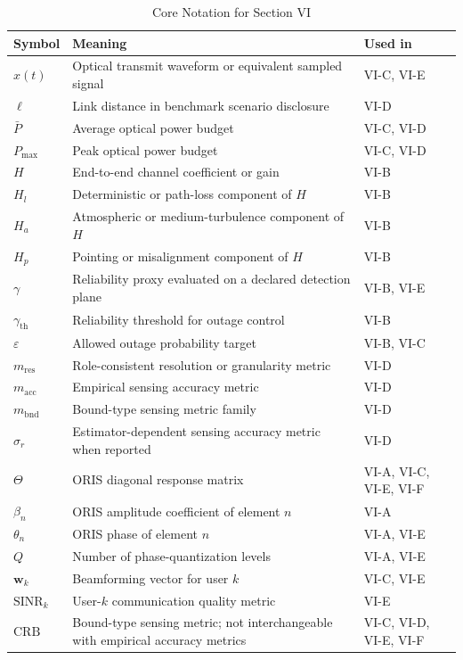 \begin{table}[!t]
\caption{Core Notation for Section VI}
\label{tab:enablers-notation}
\centering
\scriptsize
\setlength{\tabcolsep}{4pt}
\begin{tabularx}{\textwidth}{>{\raggedright\arraybackslash}p{} >{\raggedright\arraybackslash}p{} >{\raggedright\arraybackslash}X}
\toprule
\textbf{Symbol} & \textbf{Meaning} & \textbf{Used in} \\
\midrule
$x(t)$ & Optical transmit waveform or equivalent sampled signal & VI-C, VI-E \\
$\ell$ & Link distance in benchmark scenario disclosure & VI-D \\
$\bar P$ & Average optical power budget & VI-C, VI-D \\
$P_{\max}$ & Peak optical power budget & VI-C, VI-D \\
$H$ & End-to-end channel coefficient or gain & VI-B \\
$H_l$ & Deterministic or path-loss component of $H$ & VI-B \\
$H_a$ & Atmospheric or medium-turbulence component of $H$ & VI-B \\
$H_p$ & Pointing or misalignment component of $H$ & VI-B \\
$\gamma$ & Reliability proxy evaluated on a declared detection plane & VI-B, VI-E \\
$\gamma_{\text{th}}$ & Reliability threshold for outage control & VI-B \\
$\varepsilon$ & Allowed outage probability target & VI-B, VI-C \\
$m_{\text{res}}$ & Role-consistent resolution or granularity metric & VI-D \\
$m_{\text{acc}}$ & Empirical sensing accuracy metric & VI-D \\
$m_{\text{bnd}}$ & Bound-type sensing metric family & VI-D \\
$\sigma_r$ & Estimator-dependent sensing accuracy metric when reported & VI-D \\
$\Theta$ & ORIS diagonal response matrix & VI-A, VI-C, VI-E, VI-F \\
$\beta_n$ & ORIS amplitude coefficient of element $n$ & VI-A \\
$\theta_n$ & ORIS phase of element $n$ & VI-A, VI-E \\
$Q$ & Number of phase-quantization levels & VI-A, VI-E \\
$\mathbf{w}_k$ & Beamforming vector for user $k$ & VI-C, VI-E \\
$\mathrm{SINR}_k$ & User-$k$ communication quality metric & VI-E \\
$\mathrm{CRB}$ & Bound-type sensing metric; not interchangeable with empirical accuracy metrics & VI-C, VI-D, VI-E, VI-F \\
\bottomrule
\end{tabularx}
\end{table}


